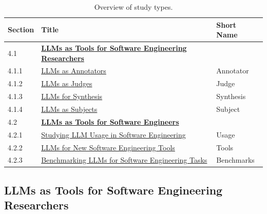 \documentclass[smallextended]{svjour3}
\begin{document}
\begin{table}[tb]
\centering
\caption{Overview of study types.}
\label{tab:study-types}
\begin{tabular}{@{}lll@{}}
\toprule
\textbf{Section} & \textbf{Title} & \textbf{Short Name} \\
\midrule
4.1   & \textbf{\hyperref[sec:llms-as-tools-for-software-engineering-researchers]{LLMs as Tools for Software Engineering Researchers}}                 &            \\
4.1.1 & \quad \hyperref[sec:llms-as-annotators]{LLMs as Annotators}                                                                                  & Annotator  \\
4.1.2 & \quad \hyperref[sec:llms-as-judges]{LLMs as Judges}                                                                                          & Judge      \\
4.1.3 & \quad \hyperref[sec:llms-for-synthesis]{LLMs for Synthesis}                                                                                  & Synthesis  \\
4.1.4 & \quad \hyperref[sec:llms-as-subjects]{LLMs as Subjects}                                                                                      & Subject    \\
\midrule
4.2   & \textbf{\hyperref[sec:llms-as-tools-for-software-engineers]{LLMs as Tools for Software Engineers}}                                           &            \\
4.2.1 & \quad \hyperref[sec:studying-llm-usage-in-software-engineering]{Studying LLM Usage in Software Engineering}                                  & Usage      \\
4.2.2 & \quad \hyperref[sec:llms-for-new-software-engineering-tools]{LLMs for New Software Engineering Tools}                                        & Tools      \\
4.2.3 & \quad \hyperref[sec:benchmarking-llms-for-software-engineering-tasks]{Benchmarking LLMs for Software Engineering Tasks}                      & Benchmarks \\
\bottomrule
\end{tabular}
\end{table}

\subsection{LLMs as Tools for Software Engineering Researchers}
\label{sec:llms-as-tools-for-software-engineering-researchers}
\end{document}
